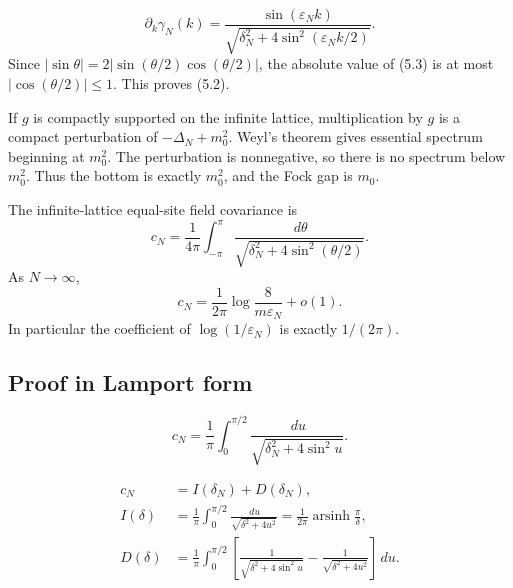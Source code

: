 \documentclass[11pt,a4paper]{article}
\newcommand{\eps}{\varepsilon}
\newcommand{\dd}{\,d}
\begin{document}
\[
 \partial_k\gamma_N(k)
 =\frac{\sin(\eps_Nk)}
 {\sqrt{\delta_N^2+4\sin^2(\eps_Nk/2)}}.                         \tag{5.3}
\]
Since $|\sin\theta|=2|\sin(\theta/2)\cos(\theta/2)|$, the absolute value
of (5.3) is at most $|\cos(\theta/2)|\leq1$.  This proves (5.2).


If $g$ is compactly supported on the infinite lattice, multiplication by $g$ is a
compact perturbation of $-\Delta_N+m_0^2$.  Weyl's theorem gives essential
spectrum beginning at $m_0^2$.  The perturbation is nonnegative, so there is no
spectrum below $m_0^2$.  Thus the bottom is exactly $m_0^2$, and the Fock gap is
$m_0$. \QedStep

\begin{proposition}\label{prop:wick}
The infinite-lattice equal-site field covariance is
\[
 c_N=\frac1{4\pi}\int_{-\pi}^{\pi}
 \frac{\dd\theta}{\sqrt{\delta_N^2+4\sin^2(\theta/2)}}.         \tag{5.4}
\]
As $N\to\infty$,
\[
 c_N=\frac1{2\pi}\log\frac{8}{m\eps_N}+o(1).                   \tag{5.5}
\]
In particular the coefficient of $\log(1/\eps_N)$ is exactly $1/(2\pi)$.
\end{proposition}

\subsection*{Proof in Lamport form}

\[
 c_N=\frac1\pi\int_0^{\pi/2}
 \frac{\dd u}{\sqrt{\delta_N^2+4\sin^2u}}.                      \tag{5.6}
\]

\begin{align}
 c_N&=I(\delta_N)+D(\delta_N),                                  \tag{5.7}\\
 I(\delta)&=\frac1\pi\int_0^{\pi/2}
 \frac{\dd u}{\sqrt{\delta^2+4u^2}}
 =\frac1{2\pi}\operatorname{arsinh}\frac\pi\delta,           \tag{5.8}\\
 D(\delta)&=\frac1\pi\int_0^{\pi/2}\left[
 \frac1{\sqrt{\delta^2+4\sin^2u}}
 -\frac1{\sqrt{\delta^2+4u^2}}\right]\dd u.                   \tag{5.9}
\end{align}

\end{document}
